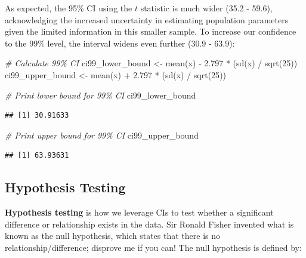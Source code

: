\documentclass[
]{book}
\newenvironment{Shaded}{\begin{snugshade}}{\end{snugshade}}
\newcommand{\CommentTok}[1]{\textcolor[rgb]{0.56,0.35,0.01}{\textit{#1}}}
\newcommand{\DecValTok}[1]{\textcolor[rgb]{0.00,0.00,0.81}{#1}}
\newcommand{\FloatTok}[1]{\textcolor[rgb]{0.00,0.00,0.81}{#1}}
\newcommand{\FunctionTok}[1]{\textcolor[rgb]{0.00,0.00,0.00}{#1}}
\newcommand{\NormalTok}[1]{#1}
\newcommand{\OtherTok}[1]{\textcolor[rgb]{0.56,0.35,0.01}{#1}}
\newcommand{\SpecialCharTok}[1]{\textcolor[rgb]{0.00,0.00,0.00}{#1}}
\begin{document}
As expected, the 95\% CI using the \(t\) statistic is much wider (35.2 - 59.6), acknowledging the increased uncertainty in estimating population parameters given the limited information in this smaller sample. To increase our confidence to the 99\% level, the interval widens even further (30.9 - 63.9):

\begin{Shaded}
\begin{Highlighting}[]
\CommentTok{\# Calculate 99\% CI}
\NormalTok{ci99\_lower\_bound }\OtherTok{\textless{}{-}} \FunctionTok{mean}\NormalTok{(x) }\SpecialCharTok{{-}} \FloatTok{2.797} \SpecialCharTok{*}\NormalTok{ (}\FunctionTok{sd}\NormalTok{(x) }\SpecialCharTok{/} \FunctionTok{sqrt}\NormalTok{(}\DecValTok{25}\NormalTok{))}
\NormalTok{ci99\_upper\_bound }\OtherTok{\textless{}{-}} \FunctionTok{mean}\NormalTok{(x) }\SpecialCharTok{+} \FloatTok{2.797} \SpecialCharTok{*}\NormalTok{ (}\FunctionTok{sd}\NormalTok{(x) }\SpecialCharTok{/} \FunctionTok{sqrt}\NormalTok{(}\DecValTok{25}\NormalTok{))}
\end{Highlighting}
\end{Shaded}

\begin{Shaded}
\begin{Highlighting}[]
\CommentTok{\# Print lower bound for 99\% CI}
\NormalTok{ci99\_lower\_bound}
\end{Highlighting}
\end{Shaded}

\begin{verbatim}
## [1] 30.91633
\end{verbatim}

\begin{Shaded}
\begin{Highlighting}[]
\CommentTok{\# Print upper bound for 99\% CI}
\NormalTok{ci99\_upper\_bound}
\end{Highlighting}
\end{Shaded}

\begin{verbatim}
## [1] 63.93631
\end{verbatim}

\hypertarget{hypothesis-testing}{%
\subsection{Hypothesis Testing}\label{hypothesis-testing}}

\textbf{Hypothesis testing} is how we leverage CIs to test whether a significant difference or relationship exists in the data. Sir Ronald Fisher invented what is known as the null hypothesis, which states that there is no relationship/difference; disprove me if you can! The null hypothesis is defined by:
\end{document}
